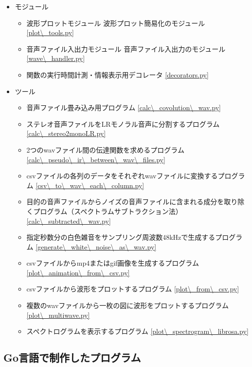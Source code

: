 \begin{itemize}
\tightlist
\item
  モジュール

  \begin{itemize}
  \item
    波形プロットモジュール 波形プロット簡易化のモジュール
    \ref{plot\_tools.py}
  \item
    音声ファイル入出力モジュール
    音声ファイル入出力のモジュール \ref{wave\_handler.py}
  \item
    関数の実行時間計測・情報表示用デコレータ \ref{decorators.py}
  \end{itemize}

\item
  ツール

  \begin{itemize}
  \item
    音声ファイル畳み込み用プログラム \ref{calc\_covolution\_wav.py}
  \item
    ステレオ音声ファイルをLRモノラル音声に分割するプログラム
    \ref{calc\_stereo2monoLR.py}
  \item
    2つのwavファイル間の伝達関数を求めるプログラム
    \ref{calc\_pseudo\_ir\_between\_wav\_files.py}
  \item
    csvファイルの各列のデータをそれぞれwavファイルに変換するプログラム
    \ref{csv\_to\_wav\_each\_column.py}
  \item
    目的の音声ファイルからノイズの音声ファイルに含まれる成分を取り除くプログラム（スペクトラムサブトラクション法）
    \ref{calc\_subtracted\_wav.py}
  \item
    指定秒数分の白色雑音をサンプリング周波数48kHzで生成するプログラム
    \ref{generate\_white\_noise\_as\_wav.py}
  \item
    csvファイルからmp4またはgif画像を生成するプログラム
    \ref{plot\_animation\_from\_csv.py}
  \item
    csvファイルから波形をプロットするプログラム \ref{plot\_from\_csv.py}
  \item
    複数のwavファイルから一枚の図に波形をプロットするプログラム
    \ref{plot\_multiwave.py}
  \item
    スペクトログラムを表示するプログラム \ref{plot\_spectrogram\_librosa.py}
  \end{itemize}
\end{itemize}

\subsection{Go言語で制作したプログラム}\label{go}

